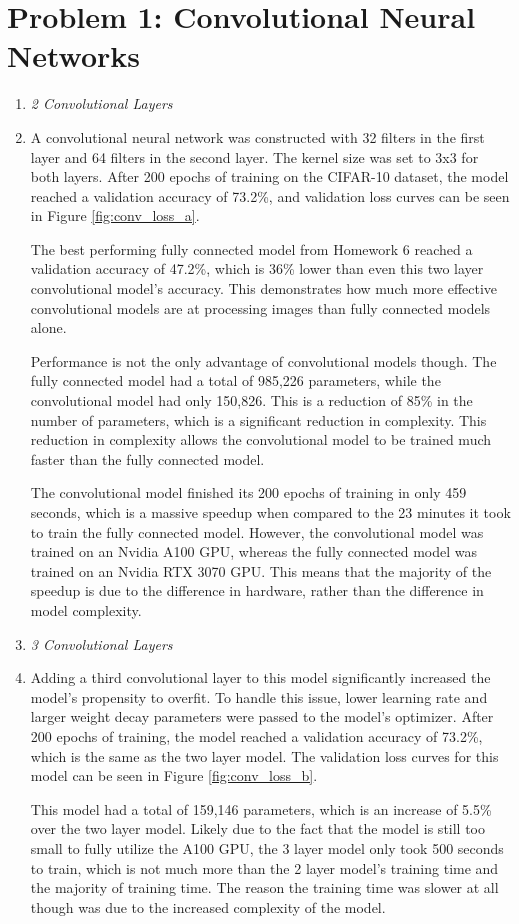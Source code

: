 \documentclass{article}
\begin{document}


\section{Problem 1: Convolutional Neural Networks}
\begin{enumerate}[label=\alph*. ]
    \item \textit{2 Convolutional Layers}
    \item 
     A convolutional neural network was constructed with 32 filters in the first layer and 64 filters in the second layer. The kernel size was set to 3x3 for both layers. After 200 epochs of training on the CIFAR-10 dataset, the model reached a validation accuracy of 73.2\%, and validation loss curves can be seen in Figure \ref{fig:conv_loss_a}. 
     
     The best performing fully connected model from Homework 6 reached a validation accuracy of 47.2\%, which is 36\% lower than even this two layer convolutional model's accuracy. This demonstrates how much more effective convolutional models are at processing images than fully connected models alone. 
     
     Performance is not the only advantage of convolutional models though. The fully connected model had a total of 985,226 parameters, while the convolutional model had only 150,826. This is a reduction of 85\% in the number of parameters, which is a significant reduction in complexity. This reduction in complexity allows the convolutional model to be trained much faster than the fully connected model. 
     
     The convolutional model finished its 200 epochs of training in only 459 seconds, which is a massive speedup when compared to the 23 minutes it took to train the fully connected model. However, the convolutional model was trained on an Nvidia A100 GPU, whereas the fully connected model was trained on an Nvidia RTX 3070 GPU. This means that the majority of the speedup is due to the difference in hardware, rather than the difference in model complexity.
     
     \item \textit{3 Convolutional Layers}
     \item 
     Adding a third convolutional layer to this model significantly increased the model's propensity to overfit. To handle this issue, lower learning rate and larger weight decay parameters were passed to the model's optimizer. After 200 epochs of training, the model reached a validation accuracy of 73.2\%, which is the same as the two layer model. The validation loss curves for this model can be seen in Figure \ref{fig:conv_loss_b}.

     This model had a total of 159,146 parameters, which is an increase of 5.5\% over the two layer model.  Likely due to the fact that the model is still too small to fully utilize the A100 GPU, the 3 layer model only took 500 seconds to train, which is not much more than the 2 layer model's training time and the majority of training time. The reason the training time was slower at all though was due to the increased complexity of the model.     

\end{enumerate}
\end{document}
